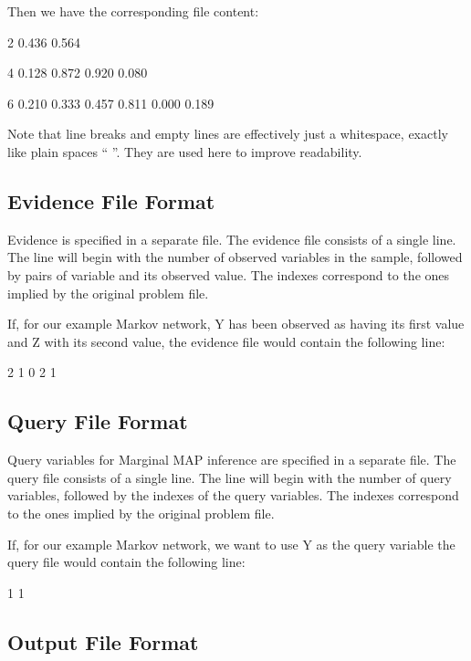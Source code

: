 Then we have the corresponding file content\+: \begin{DoxyVerb}    2
     0.436 0.564

    4
     0.128 0.872
     0.920 0.080

    6
     0.210 0.333 0.457
     0.811 0.000 0.189
\end{DoxyVerb}


Note that line breaks and empty lines are effectively just a whitespace, exactly like plain spaces “ ”. They are used here to improve readability.

\subsection*{Evidence File Format}

Evidence is specified in a separate file. The evidence file consists of a single line. The line will begin with the number of observed variables in the sample, followed by pairs of variable and its observed value. The indexes correspond to the ones implied by the original problem file.

If, for our example Markov network, {\ttfamily Y} has been observed as having its first value and {\ttfamily Z} with its second value, the evidence file would contain the following line\+: \begin{DoxyVerb}    2 1 0 2 1
\end{DoxyVerb}


\subsection*{Query File Format}

Query variables for Marginal M\+AP inference are specified in a separate file. The query file consists of a single line. The line will begin with the number of query variables, followed by the indexes of the query variables. The indexes correspond to the ones implied by the original problem file.

If, for our example Markov network, we want to use {\ttfamily Y} as the query variable the query file would contain the following line\+: \begin{DoxyVerb}    1 1
\end{DoxyVerb}


\subsection*{Output File Format}

